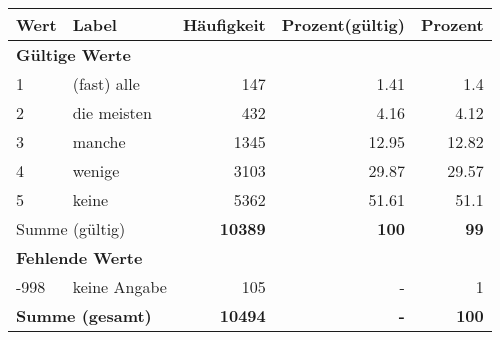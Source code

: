      \begin{longtable}{lXrrr}
     \toprule
     \textbf{Wert} & \textbf{Label} & \textbf{Häufigkeit} & \textbf{Prozent(gültig)} & \textbf{Prozent} \\
     \endhead
     \midrule
     \multicolumn{5}{l}{\textbf{Gültige Werte}}\\

     1 &
     \multicolumn{1}{X}{ (fast) alle   } &


       \num{147} &
       \num[round-mode=places,round-precision=2]{1,41} &
         \num[round-mode=places,round-precision=2]{1,4} \\

     2 &
     \multicolumn{1}{X}{ die meisten   } &


       \num{432} &
       \num[round-mode=places,round-precision=2]{4,16} &
         \num[round-mode=places,round-precision=2]{4,12} \\

     3 &
     \multicolumn{1}{X}{ manche   } &


       \num{1345} &
       \num[round-mode=places,round-precision=2]{12,95} &
         \num[round-mode=places,round-precision=2]{12,82} \\

     4 &
     \multicolumn{1}{X}{ wenige   } &


       \num{3103} &
       \num[round-mode=places,round-precision=2]{29,87} &
         \num[round-mode=places,round-precision=2]{29,57} \\

     5 &
     \multicolumn{1}{X}{ keine   } &


       \num{5362} &
       \num[round-mode=places,round-precision=2]{51,61} &
         \num[round-mode=places,round-precision=2]{51,1} \\
     \midrule
     \multicolumn{2}{l}{Summe (gültig)} &
       \textbf{\num{10389}} &
     \textbf{100} &
       \textbf{\num[round-mode=places,round-precision=2]{99}} \\
     \multicolumn{5}{l}{\textbf{Fehlende Werte}}\\
       -998 &
       keine Angabe &
         \num{105} &
        - &
         \num[round-mode=places,round-precision=2]{1} \\
     \midrule
     \multicolumn{2}{l}{\textbf{Summe (gesamt)}} &
          \textbf{\num{10494}} &
        \textbf{-} &
        \textbf{100} \\
     \bottomrule
     \end{longtable}
     
